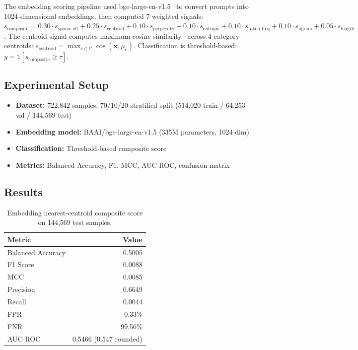 \documentclass[12pt,a4paper]{article}
\begin{document}
The embedding scoring pipeline used bge-large-en-v1.5~\citep{xiao2023bge} to convert prompts into 1024-dimensional embeddings, then computed 7 weighted signals: $s_{\text{composite}} = 0.30 \cdot s_{\text{sparse\_idf}} + 0.25 \cdot s_{\text{centroid}} + 0.10 \cdot s_{\text{perplexity}} + 0.10 \cdot s_{\text{entropy}} + 0.10 \cdot s_{\text{token\_freq}} + 0.10 \cdot s_{\text{ngram}} + 0.05 \cdot s_{\text{length}}$. The centroid signal computes maximum cosine similarity~\citep{duda2001pattern} across 4 category centroids: $s_{\text{centroid}} = \max_{c \in \mathcal{C}} \cos(\mathbf{x}, \mu_c)$. Classification is threshold-based: $y = \mathbb{1}[s_{\text{composite}} \geq \tau]$.

\subsection{Experimental Setup}

\begin{itemize}[leftmargin=*]
    \item \textbf{Dataset:} 722,842 samples, 70/10/20 stratified split (514,020 train / 64,253 val / 144,569 test)
    \item \textbf{Embedding model:} BAAI/bge-large-en-v1.5 (335M parameters, 1024-dim)
    \item \textbf{Classification:} Threshold-based composite score
    \item \textbf{Metrics:} Balanced Accuracy, F1, MCC, AUC-ROC, confusion matrix
\end{itemize}

\subsection{Results}

\begin{table}[H]
\centering
\caption{Embedding nearest-centroid composite score on 144,569 test samples.}
\label{tab:phase6_results}
\begin{tabular}{@{}lr@{}}
\toprule
\textbf{Metric} & \textbf{Value} \\
\midrule
Balanced Accuracy & 0.5005 \\
F1 Score & 0.0088 \\
MCC & 0.0085 \\
Precision & 0.6649 \\
Recall & 0.0044 \\
FPR & 0.33\% \\
FNR & 99.56\% \\
AUC-ROC & 0.5466 (0.547 rounded) \\
\bottomrule
\end{tabular}
\end{table}
\end{document}
